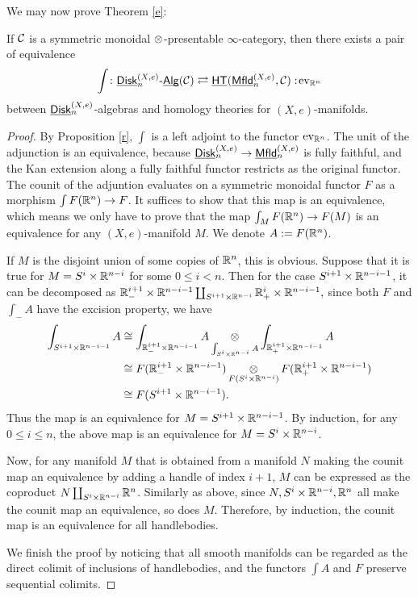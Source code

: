 \documentclass[twoside]{article}
\begin{document}
We may now prove Theorem \ref{e}:

\begin{theorem}
    If $\cal C$ is a symmetric monoidal $\otimes$-presentable $\infty$-category,
    then there exists a pair of equivalence 
    $$\int\colon\underline{\smash{\mathsf{Disk}}}_n^{(X,e)}\text{-}\underline{\smash{\mathsf{Alg}}}(\mathcal C)\rightleftarrows\underline{\smash{\mathsf{HT}}}(\underline{\smash{\mathsf{Mfld}}}_n^{(X,e)},
    \mathcal C):\!\mathrm{ev}_{\mathbb{R}^n}$$ between $\underline{\smash{\mathsf{Disk}}}_n^{(X,e)}$-algebras
    and homology theories for $(X,e)$-manifolds.
\end{theorem}

\begin{proof}
    By Proposition \ref{r}, $\int$ is a left adjoint to the functor 
    $\mathrm{ev}_{\mathbb{R}^n}$. The unit of the adjunction is an equivalence, because
    $\underline{\smash{\mathsf{Disk}}}_n^{(X,e)}\to\underline{\smash{\mathsf{Mfld}}}_n^{(X,e)}$ is fully faithful, and the Kan extension
    along a fully faithful functor restricts as the original functor. The counit
    of the adjuntion evaluates on a symmetric monoidal functor $F$ as a morphism
    $\int F(\mathbb{R}^n)\to F$. It suffices to show that this map is an equivalence, which
    means we only have to prove that the map $\int_M F(\mathbb{R}^n)\to F(M)$ is an
    equivalence for any $(X,e)$-manifold $M$. We denote $A:=F(\mathbb{R}^n)$.

    If $M$ is the disjoint union of some copies of $\mathbb{R}^n$, this is obvious. Suppose that it is true for
    $M=S^i\times\mathbb{R}^{n-i}$ for some $0\le i<n$. Then for the case 
    $S^{i+1}\times\mathbb{R}^{n-i-1}$, it can be decomposed as $\mathbb{R}^{i+1}_-\times\mathbb{R}^{n-i-1}
    \coprod_{S^{i+1}\times\mathbb{R}^{n-i}}\mathbb{R}^i_+\times\mathbb{R}^{n-i-1},$ since both
    $F$ and $\int_- A$ have the excision property, we have
    $$\begin{aligned}\int_{S^{i+1}\times\mathbb{R}^{n-i-1}}A
    &\cong\int_{\mathbb{R}^{i+1}_-\times\mathbb{R}^{n-i-1}}A
    \mathop{\operatorname{\otimes}}\limits_{\int_{S^i\times\mathbb{R}^{n-i}}A}
    \int_{\mathbb{R}^{i+1}_+\times\mathbb{R}^{n-i-1}}A\\&\cong F(\mathbb{R}^{i+1}_-\times\mathbb{R}^{n-i-1})
    \mathop{\operatorname{\otimes}}\limits_{F(S^i\times\mathbb{R}^{n-i})}
    F(\mathbb{R}^{i+1}_+\times\mathbb{R}^{n-i-1})\\&\cong F(S^{i+1}\times\mathbb{R}^{n-i-1}).\end{aligned}$$
    Thus the map is an equivalence for $M=S^{i+1}\times\mathbb{R}^{n-i-1}$. By induction,
    for any $0\le i\le n$, the above map is an equivalence 
    for $M=S^i\times\mathbb{R}^{n-i}$.

    Now, for any manifold $M$ that is obtained from a manifold $N$ making the 
    counit map an equivalence by adding a handle of index $i+1$, $M$ can be
    expressed as the coproduct $N\coprod_{S^i\times\mathbb{R}^{n-i}}\mathbb{R}^n$. Similarly as above,
    since $N,S^i\times\mathbb{R}^{n-i},\mathbb{R}^n$ all make the counit map an equivalence,
    so does $M$. Therefore, by induction, the counit map is an equivalence for all
    handlebodies.

    We finish the proof by noticing that all smooth manifolds can be regarded as the direct
    colimit of inclusions of handlebodies, and the functors $\int A$ and $F$
    preserve sequential colimits.
\end{proof}
\end{document}
